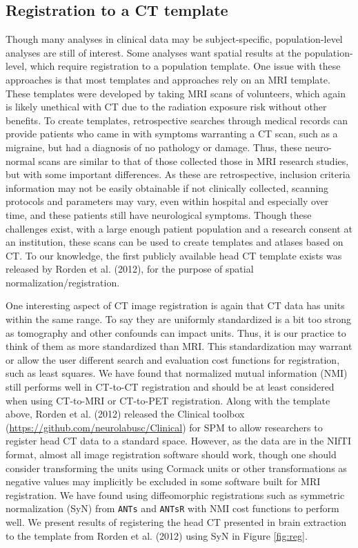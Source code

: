 \documentclass[utf8]{frontiersSCNS}
\begin{document}
\hypertarget{registration-to-a-ct-template}{%
\subsection{Registration to a CT template}\label{registration-to-a-ct-template}}

Though many analyses in clinical data may be subject-specific, population-level analyses are still of interest. Some analyses want spatial results at the population-level, which require registration to a population template. One issue with these approaches is that most templates and approaches rely on an MRI template. These templates were developed by taking MRI scans of volunteers, which again is likely unethical with CT due to the radiation exposure risk without other benefits. To create templates, retrospective searches through medical records can provide patients who came in with symptoms warranting a CT scan, such as a migraine, but had a diagnosis of no pathology or damage. Thus, these neuro-normal scans are similar to that of those collected those in MRI research studies, but with some important differences. As these are retrospective, inclusion criteria information may not be easily obtainable if not clinically collected, scanning protocols and parameters may vary, even within hospital and especially over time, and these patients still have neurological symptoms. Though these challenges exist, with a large enough patient population and a research consent at an institution, these scans can be used to create templates and atlases based on CT. To our knowledge, the first publicly available head CT template exists was released by Rorden et al. (2012), for the purpose of spatial normalization/registration.

One interesting aspect of CT image registration is again that CT data has units within the same range. To say they are uniformly standardized is a bit too strong as tomography and other confounds can impact units. Thus, it is our practice to think of them as more standardized than MRI. This standardization may warrant or allow the user different search and evaluation cost functions for registration, such as least squares. We have found that normalized mutual information (NMI) still performs well in CT-to-CT registration and should be at least considered when using CT-to-MRI or CT-to-PET registration. Along with the template above, Rorden et al. (2012) released the Clinical toolbox (\url{https://github.com/neurolabusc/Clinical}) for SPM to allow researchers to register head CT data to a standard space. However, as the data are in the NIfTI format, almost all image registration software should work, though one should consider transforming the units using Cormack units or other transformations as negative values may implicitly be excluded in some software built for MRI registration. We have found using diffeomorphic registrations such as symmetric normalization (SyN) from \texttt{ANTs} and \texttt{ANTsR} with NMI cost functions to perform well. We present results of registering the head CT presented in brain extraction to the template from Rorden et al. (2012) using SyN in Figure \ref{fig:reg}.
\end{document}
